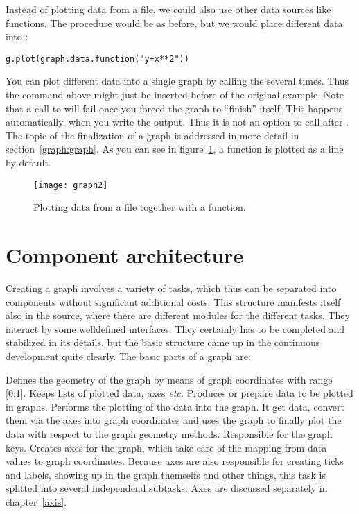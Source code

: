 Instead of plotting data from a file, we could also use other data
sources like functions. The procedure would be as before, but we would
place different data into :
\begin{verbatim}
g.plot(graph.data.function("y=x**2"))
\end{verbatim}
You can plot different data into a single graph by calling the
 several times. Thus the command above might just be
inserted before  of the original example.
Note that a call to  will fail once you forced the
graph to ``finish'' itself. This happens automatically, when you
write the output. Thus it is not an option to call 
after . The topic of the finalization of a
graph is addressed in more detail in section~\ref{graph:graph}. As
you can see in figure~\ref{fig:graph2}, a function is plotted as a
line by default.
\begin{figure}[ht]
\centerline{\texttt{[image: graph2]}}
\caption{Plotting data from a file together with a function.}
\label{fig:graph2}
\end{figure}

\section{Component architecture \label{graph:components}}

Creating a graph involves a variety of tasks, which thus can be
separated into components without significant additional costs.
This structure manifests itself also in the \PyX{} source, where there
are different modules for the different tasks. They interact by some
welldefined interfaces. They certainly has to be completed and
stabilized in its details, but the basic structure came up in the
continuous development quite clearly. The basic parts of a graph are:

\begin{definitions}
  Defines the geometry of the graph by means of graph coordinates with
  range [0:1]. Keeps lists of plotted data, axes \emph{etc.}
  Produces or prepare data to be plotted in graphs.
  Performs the plotting of the data into the graph. It get data,
  convert them via the axes into graph coordinates and uses the graph
  to finally plot the data with respect to the graph geometry methods.
  Responsible for the graph keys.
  Creates axes for the graph, which take care of the mapping from data
  values to graph coordinates. Because axes are also responsible for
  creating ticks and labels, showing up in the graph themselfs and
  other things, this task is splitted into several independend
  subtasks. Axes are discussed separately in chapter~\ref{axis}.
\end{definitions}

